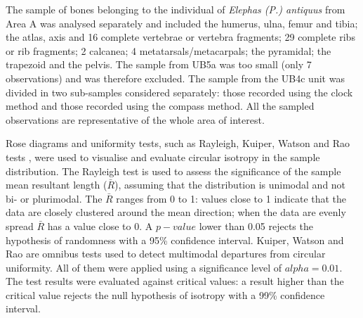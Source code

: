 \documentclass[review,authoryear,times]{elsarticle} %
\begin{document}
The sample of bones belonging to the individual of \emph{Elephas (P.) antiquus} from Area A was analysed separately and included the humerus, ulna, femur and tibia; the atlas, axis and 16 complete vertebrae or vertebra fragments; 29 complete ribs or rib fragments; 2 calcanea; 4 metatarsals/metacarpals; the pyramidal; the trapezoid and the pelvis. The sample from UB5a was too small (only 7 observations) and was therefore excluded. The sample from the UB4c unit was divided in two sub-samples considered separately: those recorded using the clock method and those recorded using the compass method. All the sampled observations are representative of the whole area of interest.

\begin{table}[]
  \caption{List of sampled observations for the fabric analysis.}
  \label{tab:1}
  \vspace{0.1in}
\end{table}

Rose diagrams and uniformity tests, such as Rayleigh, Kuiper, Watson and Rao tests \citep{Jammalamadaka2001}, were used to visualise and evaluate circular isotropy in the sample distribution. The Rayleigh test is used to assess the significance of the sample mean resultant length ($\bar{R}$), assuming that the distribution is unimodal and not bi- or plurimodal. The $\bar{R}$ ranges from 0 to 1: values close to 1 indicate that the data are closely clustered around the mean direction; when the data are evenly spread $\bar{R}$ has a value close to 0. A $p-value$ lower than 0.05 rejects the hypothesis of randomness with a 95\% confidence interval. Kuiper, Watson and Rao are omnibus tests used to detect multimodal departures from circular uniformity. All of them were applied using a significance level of $alpha=0.01$. The test results were evaluated against critical values: a result higher than the critical value rejects the null hypothesis of isotropy with a 99\% confidence interval.
\end{document}
